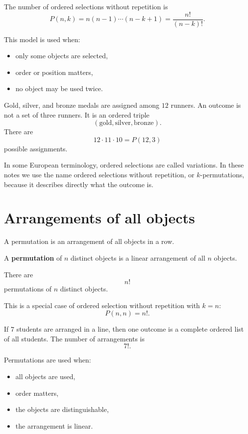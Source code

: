 The number of ordered selections without repetition is
\[
P(n,k)=n(n-1)\cdots(n-k+1)=\frac{n!}{(n-k)!}.
\]

This model is used when:
\begin{itemize}
    \item only some objects are selected,
    \item order or position matters,
    \item no object may be used twice.
\end{itemize}

\begin{examplebox}
Gold, silver, and bronze medals are assigned among \(12\) runners. An outcome is not a set of three runners. It is an ordered triple
\[
(\text{gold},\text{silver},\text{bronze}).
\]
There are
\[
12\cdot 11\cdot 10=P(12,3)
\]
possible assignments.
\end{examplebox}

In some European terminology, ordered selections are called variations. In these notes we use the name ordered selections without repetition, or \(k\)-permutations, because it describes directly what the outcome is.

\section{Arrangements of all objects}

A permutation is an arrangement of all objects in a row.

\begin{definitionbox}
A \textbf{permutation} of \(n\) distinct objects is a linear arrangement of all \(n\) objects.
\end{definitionbox}

There are
\[
n!
\]
permutations of \(n\) distinct objects.

This is a special case of ordered selection without repetition with \(k=n\):
\[
P(n,n)=n!.
\]

\begin{examplebox}
If \(7\) students are arranged in a line, then one outcome is a complete ordered list of all students. The number of arrangements is
\[
7!.
\]
\end{examplebox}

Permutations are used when:
\begin{itemize}
    \item all objects are used,
    \item order matters,
    \item the objects are distinguishable,
    \item the arrangement is linear.
\end{itemize}


